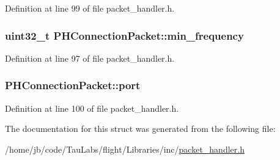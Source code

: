 \-Definition at line 99 of file packet\-\_\-handler.\-h.

\hypertarget{struct_p_h_connection_packet_a4e11c88e3be1dbcacc324aace217b7e6}{
\subsubsection[{min\-\_\-frequency}]{\setlength{\rightskip}{0pt plus 5cm}uint32\-\_\-t {\bf \-P\-H\-Connection\-Packet\-::min\-\_\-frequency}}}\label{struct_p_h_connection_packet_a4e11c88e3be1dbcacc324aace217b7e6}


\-Definition at line 97 of file packet\-\_\-handler.\-h.

\hypertarget{struct_p_h_connection_packet_ae3b874c83f519f62b7ee56a805c527d5}{
\subsubsection[{port}]{ {\bf \-P\-H\-Connection\-Packet\-::port}}}\label{struct_p_h_connection_packet_ae3b874c83f519f62b7ee56a805c527d5}


\-Definition at line 100 of file packet\-\_\-handler.\-h.



\-The documentation for this struct was generated from the following file\-:\begin{DoxyCompactItemize}
\item 
/home/jb/code/\-Tau\-Labs/flight/\-Libraries/inc/\hyperlink{packet__handler_8h}{packet\-\_\-handler.\-h}\end{DoxyCompactItemize}
